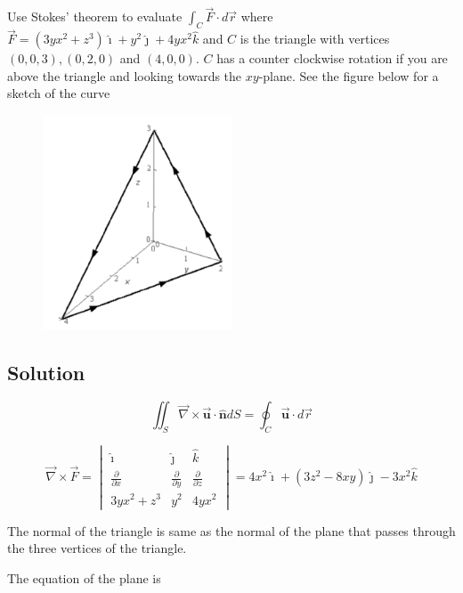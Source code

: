 \documentclass[12pt]{article}
\begin{document}
Use Stokes' theorem to evaluate \(\int_C \vec{F} \cdot d \vec{r}\) where \(\vec{F}=\left(3 y x^2+z^3\right) \hat{\imath}+y^2 \hat{\jmath}+4 y x^2 \hat{k}\) and \(C\) is the triangle with vertices \((0,0,3),(0,2,0)\) and \((4,0,0)\). \(C\) has a counter clockwise rotation if you are above the triangle and looking towards the \(x y\)-plane. See the figure below for a sketch of the curve

\begin{figure}[H]
    \centering
    \includegraphics[width=0.5\textwidth]{Q2.png}
\end{figure}

\subsection{Solution}

\[
    \iint_S \vec{\nabla} \times \overrightarrow{\boldsymbol{u}} \cdot \widehat{\boldsymbol{n}} d S=\oint_C \overrightarrow{\boldsymbol{u}} \cdot d \vec{r}
\]

\[
    \vec{\nabla} \times \vec{F} =
    \begin{vmatrix}
        \hat{\imath}                & \hat{\jmath}                & \hat{k}                     \\
        \frac{\partial}{\partial x} & \frac{\partial}{\partial y} & \frac{\partial}{\partial z} \\
        3 y x^2 + z^3               & y^2                         & 4 y x^2
    \end{vmatrix}
    = 4 x^2 \hat{\imath} + \left(3 z^2 - 8 x y\right)  \hat{\jmath} - 3 x^2 \hat{k}
\]

The normal of the triangle is same as the normal of the plane that passes through the three vertices of the triangle.

The equation of the plane is
\end{document}
